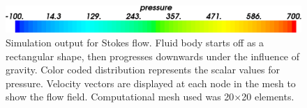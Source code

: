 \begin{figure}
\includegraphics[scale=0.25]{figures/stokes-fluid-colorbar.eps}
\caption{Simulation output for Stokes flow. Fluid body starts off as a rectangular shape, then progresses downwards under the influence of gravity. Color coded distribution represents the scalar values for pressure. Velocity vectors are displayed at each node in the mesh to show the flow field. Computational mesh used was 20$\times$20 elements.}
\label{FLUID OUTPUT1}
\end{figure}

\begin{figure}
\center
{}

\end{figure}
